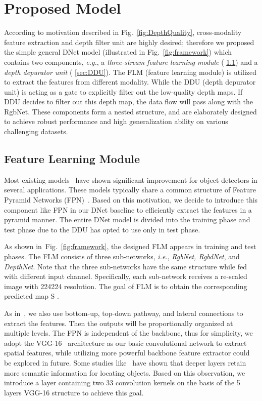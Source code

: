 \documentclass[journal]{IEEEtran}
\def\ie{\emph{i.e.}}
\def\eg{\emph{e.g.}}
\newcommand{\figref}[1]{Fig.~\ref{#1}}
\newcommand{\secref}[1]{ \ref{#1}}
\newcommand{\fdp}[1]{#1}
\begin{document}
\section{Proposed Model}\label{sec:D3Net}
According to motivation described in \figref{fig:DepthQuality}, cross-modality feature extraction and depth filter unit are highly desired; therefore we  proposed the simple general DNet \fdp{model} (illustrated in \figref{fig:framework}) which contains two components, \eg, a \emph{three-stream feature learning module} (\secref{sec:FPN}) and a \emph{depth depurator unit} (\secref{sec:DDU}).
The FLM (feature learning module) is utilized to extract the features from different modality. While the DDU (depth depurator unit) is \fdp{acting as a gate to} explicitly \fdp{filter out} the low-quality depth \fdp{maps}. \fdp{If DDU decides to filter out this depth map, the data flow will pass along with the RgbNet.}
These components form a nested structure,
\fdp{and} are elaborately designed to achieve robust performance
and high generalization ability on various challenging datasets.


\subsection{Feature Learning Module}\label{sec:FPN}
\fdp{Most existing models~\cite{kirillov2019panoptic,chen2019tensormask,xiong2019upsnet} have shown significant improvement for object detectors in several applications.
These models typically share a common structure of Feature Pyramid Networks (FPN)~\cite{lin2017feature}. Based on this motivation, we decide to introduce this component like FPN in our DNet baseline to efficiently extract the features in a pyramid manner. The entire DNet model is divided into the training phase and test phase due to the DDU has opted to use only in test phase.}

\fdp{As shown in~\figref{fig:framework}, the designed FLM appears in training and test phases.
The FLM consists of three sub-networks, \ie,\textit{ RgbNet, RgbdNet}, and \textit{DepthNet}.
Note that the three sub-networks have the same structure while fed with different input channel.
\fdp{Specifically, each sub-network receives a re-scaled image  with 224224 resolution.} The goal of FLM is to obtain the corresponding
predicted map S .}

\vspace{5pt}
\fdp{As in~\cite{lin2017feature}, we also use bottom-up, top-down pathway, and lateral connections to extract the features. Then the outputs will be proportionally organized at multiple levels.}
\fdp{The FPN is independent of the backbone, thus for simplicity, we
adopt the VGG-16~\cite{simonyan2015very} architecture as our basic convolutional network to extract spatial features,
while utilizing more powerful backbone \cite{pami20Res2net}
feature extractor could be explored in future.
Some studies like~\cite{zhao2019pyramid} have shown that deeper layers retain more semantic information for locating objects. Based on this observation, we introduce a layer containing two 33 convolution kernels on the basis of the 5 layers VGG-16 structure to achieve this goal.}
\end{document}

